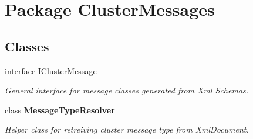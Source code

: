 \hypertarget{namespace_cluster_messages}{}\section{Package Cluster\+Messages}
\label{namespace_cluster_messages}
\subsection*{Classes}
\begin{DoxyCompactItemize}
\item 
interface \hyperlink{interface_cluster_messages_1_1_i_cluster_message}{I\+Cluster\+Message}
\begin{DoxyCompactList}\small\item\em General interface for message classes generated from Xml Schemas. \end{DoxyCompactList}\item 
class {\bfseries Message\+Type\+Resolver}
\begin{DoxyCompactList}\small\item\em Helper class for retreiving cluster message type from Xml\+Document. \end{DoxyCompactList}\end{DoxyCompactItemize}
